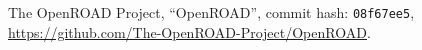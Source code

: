 The OpenROAD Project,
``OpenROAD'', commit hash: \texttt{08f67ee5},
\url{https://github.com/The-OpenROAD-Project/OpenROAD}.
